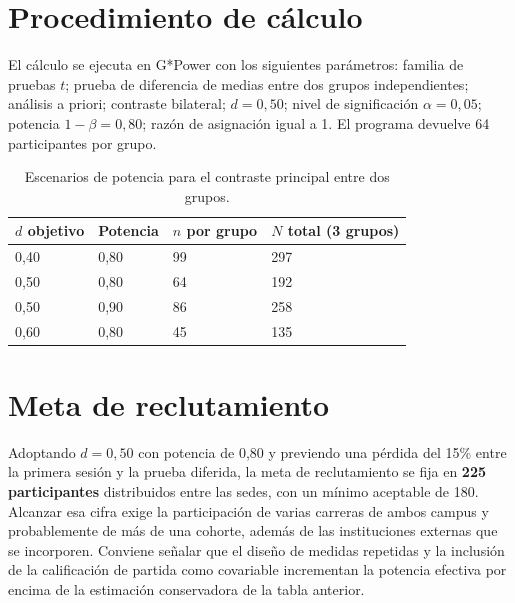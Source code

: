 \documentclass[12pt,a4paper,openany]{report}
\begin{document}
    \section{Procedimiento de c\'alculo}
    
    El c\'alculo se ejecuta en G*Power con los siguientes par\'ametros: familia de pruebas $t$; prueba de diferencia de medias entre dos grupos independientes; an\'alisis a priori; contraste bilateral; $d = 0{,}50$; nivel de significaci\'on $\alpha = 0{,}05$; potencia $1-\beta = 0{,}80$; razón de asignaci\'on igual a 1. El programa devuelve 64 participantes por grupo.
    
    \begin{table}[htbp]
        \centering
        \caption{Escenarios de potencia para el contraste principal entre dos grupos.}
        \label{tab:potencia}
        \small
        \begin{tabular}{C{2.6cm} C{2.6cm} C{2.6cm} C{3.4cm}}
            \toprule
            \textbf{$d$ objetivo} & \textbf{Potencia} & \textbf{$n$ por grupo} & \textbf{$N$ total (3 grupos)} \\
            40 & 0{,}80 & 99 & 297 \\
            0{,}50 & 0{,}80 & 64 & 192 \\
            0{,}50 & 0{,}90 & 86 & 258 \\
            0{,}60 & 0{,}80 & 45 & 135 \\
            \bottomrule
        \end{tabular}
    \end{table}
    
    \section{Meta de reclutamiento}
    
    Adoptando $d = 0{,}50$ con potencia de 0{,}80 y previendo una p\'erdida del 15\% entre la primera sesi\'on y la prueba diferida, la meta de reclutamiento se fija en \textbf{225 participantes} distribuidos entre las sedes, con un m\'inimo aceptable de 180. Alcanzar esa cifra exige la participaci\'on de varias carreras de ambos campus y probablemente de m\'as de una cohorte, adem\'as de las instituciones externas que se incorporen. Conviene se\~nalar que el dise\~no de medidas repetidas y la inclusi\'on de la calificaci\'on de partida como covariable incrementan la potencia efectiva por encima de la estimaci\'on conservadora de la tabla anterior.
    
\end{document}
